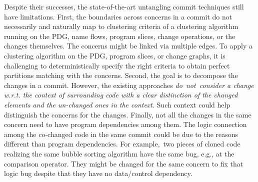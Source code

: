 

Despite their successes, the state-of-the-art untangling commit
techniques still have limitations. First, the boundaries across concerns 
in a commit do not necessarily and naturally map to
clustering criteria of a clustering algorithm running on the PDG, name
flows, program slices, change operations, or the changes
themselves. The concerns might be linked via multiple edges.
To apply a clustering algorithm on the PDG, program slices, or change
graphs, it is challenging to deterministically specify the right
criteria to obtain perfect partitions matching with the concerns.
%
Second, the goal is to decompose the changes in a commit. However, the
existing approaches {\em do~not~consider a change w.r.t. the context
  of surrounding code with a clear distinction of the changed elements
  and the un-changed ones in the context}. Such context could help
distinguish the concerns for the changes. Finally, not all the changes
in the same concern need to have program dependencies among them. The
logic connection among the co-changed code in the same commit could be
due to the reasons different than program dependencies. For
example,~two pieces of cloned code realizing the same bubble sorting
algorithm have the same bug, e.g., at the comparison operator. They
might be changed for the same concern to fix that logic bug despite
that they have no data/control dependency.




